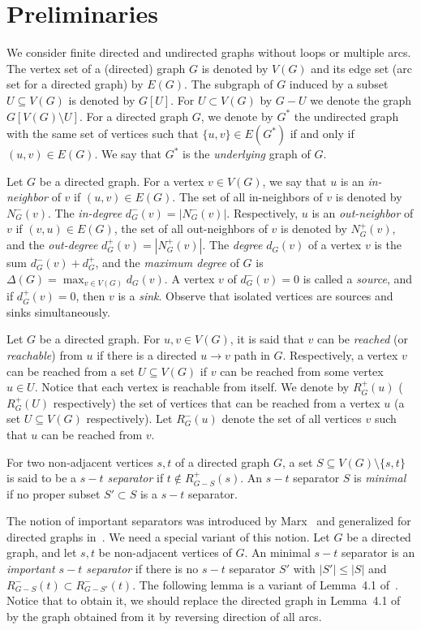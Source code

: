\documentclass[11pt,a4paper]{article}
\begin{document}
\section{Preliminaries}\label{sec:defs}
We consider finite directed and undirected graphs without loops or multiple arcs. The vertex set of a (directed) graph $G$ is
denoted by $V(G)$ and its edge set (arc set for a directed graph) by $E(G)$. The subgraph of $G$ induced by a subset
$U\subseteq V(G)$ is denoted by $G[U]$. For $U\subset V(G)$ by $G-U$ we denote the graph $G[V(G)\setminus U]$. For a directed
graph $G$, we denote by $G^*$ the undirected graph with the same set of vertices such that $\{u,v\}\in E(G^*)$ if and only if
$(u,v)\in E(G)$. We say that $G^*$ is the \emph{underlying} graph of $G$.

Let $G$ be a directed graph. For a vertex $v\in V(G)$, we say that $u$ is an \emph{in-neighbor} of $v$ if $(u,v)\in E(G)$. The
set of all in-neighbors of $v$ is denoted by $N_G^-(v)$. The \emph{in-degree} $d_G^-(v)=|N_G^-(v)|$. Respectively, $u$ is an
\emph{out-neighbor} of $v$ if $(v,u)\in E(G)$, the set of all out-neighbors of $v$ is denoted by $N_G^+(v)$, and the
\emph{out-degree} $d_G^+(v)=|N_G^+(v)|$. The \emph{degree} $d_G(v)$ of a vertex $v$ is the sum $d_G^-(v)+d_G^+$, and the
\emph{maximum degree} of $G$ is $\Delta(G)=\max_{v\in V(G)}d_G(v)$. A vertex $v$ of $d_G^-(v)=0$ is called a \emph{source},
and if  $d_G^+(v)=0$, then $v$ is a \emph{sink}. Observe that isolated vertices are sources and sinks simultaneously.



Let $G$ be a directed graph. For $u,v\in V(G)$, it is said that $v$ can be \emph{reached} (or \emph{reachable}) from $u$ if
there is a directed $u\rightarrow v$ path in $G$. Respectively, a vertex $v$ can be reached from a set $U\subseteq V(G)$ if
$v$ can be reached from some vertex $u\in U$. Notice that each vertex is reachable from itself. We denote by $R_G^+(u)$
($R_G^+(U)$ respectively) the set of vertices that can be reached from a vertex $u$ (a set $U\subseteq V(G)$ respectively).
Let $R_G^-(u)$ denote the set of all vertices $v$ such that $u$ can be reached from $v$.

For two non-adjacent vertices $s,t$ of a directed graph $G$, a set $S\subseteq V(G)\setminus\{s,t\}$ is said to be a
\emph{$s-t$ separator} if $t\notin R_{G-S}^+(s)$. An $s-t$ separator $S$ is \emph{minimal} if no proper subset $S'\subset S$
is a $s-t$ separator.

The notion of important separators was introduced by Marx~\cite{Marx06} and generalized for directed graphs
in~\cite{ChitnisHM12}. We need a special variant of this notion. Let $G$ be a directed graph, and let $s,t$ be non-adjacent
vertices of $G$. An minimal $s-t$ separator is an \emph{important $s-t$ separator} if there is no $s-t$ separator $S'$ with
$|S'|\leq |S|$ and $R_{G-S}^-(t)\subset R_{G-S'}^-(t)$. The following lemma is a variant of Lemma~4.1 of~\cite{ChitnisHM12}.
Notice that to obtain it, we should replace the directed graph in Lemma~4.1 of~\cite{ChitnisHM12} by the graph obtained from
it by reversing direction of all arcs.
\end{document}
